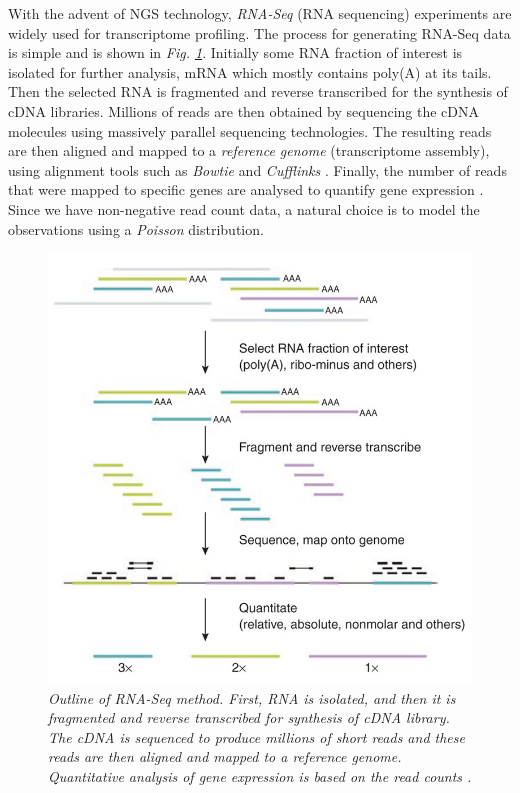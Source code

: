 With the advent of NGS technology, \emph{RNA-Seq} (RNA sequencing) experiments \citep{Wang2009} are widely used for transcriptome profiling. The process for generating RNA-Seq data is simple and is shown in \emph{Fig. \ref{rnaSeq-pic}}. Initially some RNA fraction of interest is isolated for further analysis, \eg mRNA which mostly contains poly(A) at its tails. Then the selected RNA is fragmented and reverse transcribed for the synthesis of cDNA libraries. Millions of reads are then obtained by sequencing the cDNA molecules using massively parallel sequencing technologies. The resulting reads are then aligned and mapped to a \emph{reference genome} (\ie transcriptome assembly), using alignment tools such as \emph{Bowtie} \citep{Langmead2009} and \emph{Cufflinks} \citep{Trapnell2010}. Finally, the number of reads that were mapped to specific genes are analysed to quantify gene expression \citep{Pepke2009}. Since we have non-negative read count data, a natural choice is to model the observations using a \emph{Poisson} distribution.
\begin{figure}[!ht]
\begin{center}
 \includegraphics[scale = 0.45]{images/rna-seq}
\caption{\emph{Outline of RNA-Seq method. First, RNA is isolated, and then it is fragmented and reverse transcribed for synthesis of cDNA library. The cDNA is sequenced to produce millions of short reads and these reads are then aligned and mapped to a reference genome. Quantitative analysis of gene expression is based on the read counts \citep{Pepke2009}.}}
\label{rnaSeq-pic}
\end{center}
\end{figure}

